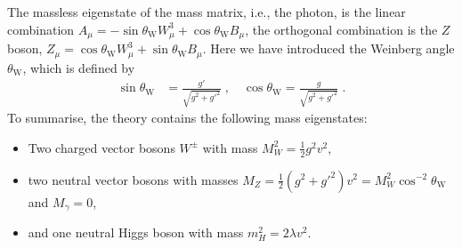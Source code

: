 \documentclass[12pt]{report}
\newcommand{\2}{\ensuremath{\sqrt{2}\,}}
\begin{document}
{      
      The massless eigenstate of the mass matrix, i.e., the photon,  is the linear combination \mbox{$A_\mu
      =-\sin\theta_\text{W} W^3_\mu +\cos \theta_\text{W} B_\mu$}, the orthogonal combination is the
      $Z$ boson, \mbox{$Z_\mu = \cos \theta_\text{W}W^3_\mu + \sin\theta_\text{W} B_\mu$}. Here we
      have introduced the Weinberg angle $\theta_\text{W}$, which is defined by
      \begin{align}
        \sin \theta_\text{W} &= \frac{g'}{\sqrt{g^2+g'^2}}\;, \quad\cos \theta_\text{W}
        = \frac{g}{\sqrt{g^2+g'^2}}\;.
      \end{align}
      To summarise, the theory contains the following mass eigenstates:
      \begin{itemize}
        \item Two charged vector bosons $W^\pm$ with mass $M_W^2=\frac{1}{2} g^2 v^2$,
        \item two neutral vector bosons with masses $M_Z=\frac{1}{2}\left(g^2+g'^2\right) v^2
          =M_W^2\cos^{-2}\theta_\text{W}$ and \mbox{$M_\gamma=0$}, 
        \item and one neutral Higgs boson with mass $m_H^2=2\lambda v^2$.
      \end{itemize}

}
\end{document}
